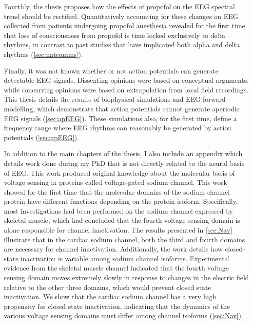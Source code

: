 Fourthly, the thesis proposes how the effects of propofol on the EEG spectral trend should be rectified. Quantitatively accounting for these changes on EEG collected from patients undergoing propofol anesthesia revealed for the first time that loss of consciousness from propofol is time locked exclusively to delta rhythms, in contrast to past studies that have implicated both alpha and delta rhythms  (\autoref{sec:natcomms}).

Finally, it was not known whether or not action potentials can generate detectable EEG signals. Dissenting opinions were based on conceptual arguments, while concurring opinions were based on extrapolation from local field recordings. This thesis details the results of biophysical simulations and EEG forward modelling, which demonstrate that action potentials cannot generate aperiodic EEG signals (\autoref{sec:apEEG}). These simulations also, for the first time, define a frequency range where EEG rhythms can reasonably be generated by action potentials (\autoref{sec:apEEG}).

In addition to the main chapters of the thesis, I also include an appendix which details work done during my PhD that is not directly related to the neural basis of EEG. This work produced original knowledge about the molecular basis of voltage sensing in proteins called voltage-gated sodium channel. This work showed for the first time that the molecular domains of the sodium channel protein have different functions depending on the protein isoform. Specifically, most investigations had been performed on the sodium channel expressed by skeletal muscle, which had concluded that the fourth voltage sensing domain is alone responsible for channel inactivation. The results presented in \autoref{sec:Nav} illustrate that in the cardiac sodium channel, both the third and fourth domains are necessary for channel inactivation. Additionally, the work details how closed-state inactivation is variable among sodium channel isoforms. Experimental evidence from the skeletal muscle channel indicated that the fourth voltage sensing domain moves extremely slowly in response to changes in the electric field relative to the other three domains, which would prevent closed state inactivation. We show that the cardiac sodium channel has a very high propensity for closed state inactivation, indicating that the dynamics of the various voltage sensing domains must differ among channel isoforms (\autoref{sec:Nav}).

